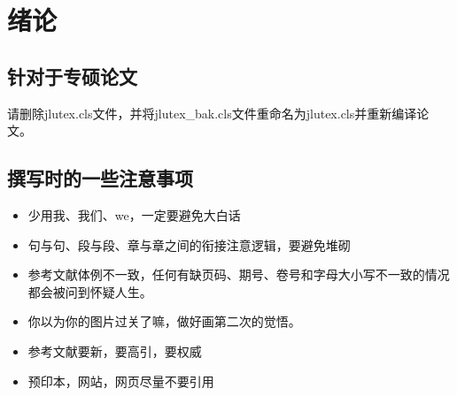 \chapter{绪论}
\section{针对于专硕论文}
请删除jlutex.cls文件，并将jlutex\_bak.cls文件重命名为jlutex.cls并重新编译论文。

\section{撰写时的一些注意事项}
\begin{itemize}
	\item 少用我、我们、we，一定要避免大白话
	\item 句与句、段与段、章与章之间的衔接注意逻辑，要避免堆砌
	\item 参考文献体例不一致，任何有缺页码、期号、卷号和字母大小写不一致的情况都会被问到怀疑人生。
	\item 你以为你的图片过关了嘛，做好画第二次的觉悟。
	\item 参考文献要新，要高引，要权威
	\item 预印本，网站，网页尽量不要引用
\end{itemize}

